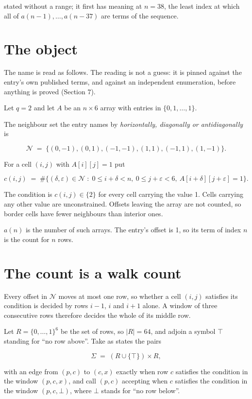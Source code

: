 \documentclass[11pt]{article}
\theoremstyle{definition}
\begin{document}
stated without a range; it first has meaning at $n = 38$, the least index at which all of $a(n-1),\dots,a(n-37)$ are terms of the sequence.

\section{The object}

The name is read as follows. The reading is not a guess: it is pinned against the entry's own published terms, and against an independent enumeration, before anything is proved (Section 7).

Let $q = 2$ and let $A$ be an $n \times 6$ array with entries in $\{0,1,\dots,1\}$.

The neighbour set the entry names by {\itshape horizontally, diagonally or antidiagonally} is

\[\mathcal{N} \;=\; \{(0,-1), (0,1), (-1,-1), (1,1), (-1,1), (1,-1)\}.\]

For a cell $(i,j)$ with $A[i][j] = 1$ put

\[c(i,j) \;=\; \#\bigl\{(\delta,\varepsilon)\in\mathcal{N} \;:\; 0\le i+\delta<n,\ 0\le j+\varepsilon<6,\ A[i+\delta][j+\varepsilon] = 1\bigr\}.\]

The condition is $c(i,j) \in \{2\}$ for every cell carrying the value 1. Cells carrying any other value are unconstrained. Offsets leaving the array are not counted, so border cells have fewer neighbours than interior ones.

$a(n)$ is the number of such arrays. The entry's offset is 1, so its term of index $n$ is the count for $n$ rows.

\section{The count is a walk count}

Every offset in $\mathcal{N}$ moves at most one row, so whether a cell $(i,j)$ satisfies its condition is decided by rows $i-1$, $i$ and $i+1$ alone. A window of three consecutive rows therefore decides the whole of its middle row.

Let $R = \{0,\dots,1\}^{6}$ be the set of rows, so $|R| = 64$, and adjoin a symbol $\top$ standing for ``no row above''. Take as states the pairs

\[\Sigma \;=\; (R \cup \{\top\}) \times R,\]

with an edge from $(p,c)$ to $(c,x)$ exactly when row $c$ satisfies the condition in the window $(p,c,x)$, and call $(p,c)$ accepting when $c$ satisfies the condition in the window $(p,c,\bot)$, where $\bot$ stands for ``no row below''.
\end{document}
